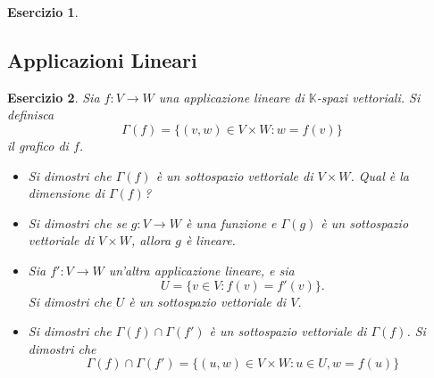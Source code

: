 \documentclass{article}
\newtheorem{es}{Esercizio}
\begin{document}
{\begin{es}
\begin{itemize}
    \end{itemize}
\end{es}



\subsection{Applicazioni Lineari}



\begin{es}
    Sia $f:V\to W$ una applicazione lineare di $\mathbb{K}$-spazi vettoriali. Si definisca $$\Gamma(f)=\{(v,w)\in V\times W:w=f(v)\}$$ il grafico di $f$.\\
    \begin{itemize}
        \item Si dimostri che $\Gamma(f)$ è un sottospazio vettoriale di $V\times W$. Qual è la dimensione di $\Gamma(f)$?
        \item Si dimostri che se $g:V\to W$ è una funzione e $\Gamma(g)$ è un sottospazio vettoriale di $V\times W$, allora $g$ è lineare.
        \item Sia $f':V\to W$ un'altra applicazione lineare, e sia $$U=\{v\in V: f(v)=f'(v)\}.$$
        Si dimostri che $U$ è un sottospazio vettoriale di $V$.
        \item Si dimostri che $\Gamma(f)\cap \Gamma(f')$ è un sottospazio vettoriale di $\Gamma(f)$. Si dimostri che $$\Gamma(f)\cap \Gamma(f')=\{(u,w)\in V\times W:u\in U, w=f(u)\}$$
    \end{itemize}
\end{es}


}
\end{document}
